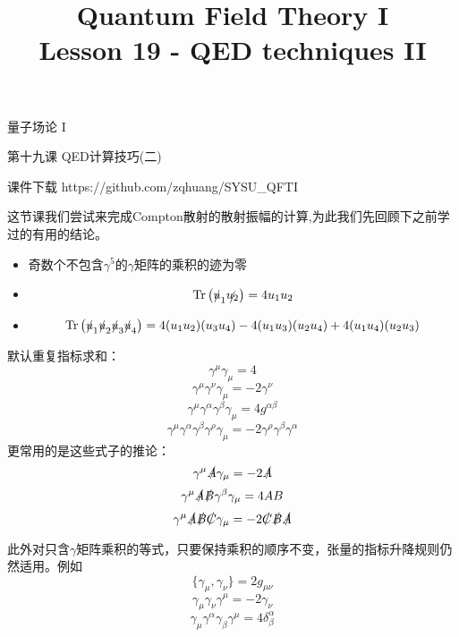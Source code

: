 \documentclass[CJK]{beamer}
\title{Quantum Field Theory I \\ Lesson 19 - QED techniques II}
\author{}
\date{}
\begin{document}
\begin{frame}
 
\begin{center}
\begin{Large}
\bch
量子场论 I 

{\vskip 0.3in}

第十九课 QED计算技巧(二)

\ech
\end{Large}
\end{center}

\vskip 0.2in

\bch
课件下载
\ech
https://github.com/zqhuang/SYSU\_QFTI

\end{frame}



\begin{frame}
\bch
{\small
这节课我们尝试来完成Compton散射的散射振幅的计算,为此我们先回顾下之前学过的有用的结论。

\begin{itemize}
\item{奇数个不包含$\gamma^5$的$\gamma$矩阵的乘积的迹为零}
\item{$$\mathrm{Tr}\left(\slashed{u}_1\slashed{u_2}\right) = 4u_1u_2$$ }
\item{
$$\mathrm{Tr}\left(\slashed{u}_1\slashed{u}_2\slashed{u}_3\slashed{u}_4\right) = 4(u_1u_2)(u_3u_4) - 4(u_1u_3)(u_2u_4)+4(u_1u_4)(u_2u_3) $$
}
\end{itemize}
}
\ech
\end{frame}


\begin{frame}
\bch
{\scriptsize
默认重复指标求和：
$$ \gamma^\mu\gamma_\mu = 4 $$
$$ \gamma^\mu \gamma^\nu \gamma_\mu = -2\gamma^\nu $$
$$ \gamma^\mu \gamma^\alpha\gamma^\beta\gamma_\mu = 4g^{\alpha\beta} $$
$$ \gamma^\mu \gamma^\alpha\gamma^\beta\gamma^\rho\gamma_\mu = -2\gamma^\rho\gamma^\beta\gamma^\alpha $$
更常用的是这些式子的推论：
$$ \gamma^\mu \slashed{A} \gamma_\mu = -2\slashed{A}$$
$$ \gamma^\mu \slashed{A}\slashed{B}\gamma^\beta\gamma_\mu = 4AB $$
$$ \gamma^\mu \slashed{A}\slashed{B}\slashed{C}\gamma_\mu = -2\slashed{C}\slashed{B}\slashed{A} $$

此外对只含$\gamma$矩阵乘积的等式，只要保持乘积的顺序不变，张量的指标升降规则仍然适用。例如
$$\{\gamma_\mu, \gamma_\nu\} = 2 g_{\mu\nu}$$
$$ \gamma_\mu \gamma_\nu \gamma^\mu = -2\gamma_\nu $$
$$ \gamma_\mu \gamma^\alpha\gamma_\beta \gamma^\mu = 4\delta^\alpha_\beta $$

}
\ech
\end{frame}
\end{document}
